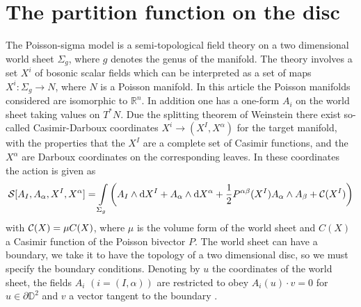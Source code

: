 \documentclass[a4paper,twoside,11pt]{article}
\numberwithin{equation}{section}
\begin{document}
\section{The partition function on the disc}
%
%
The Poisson-sigma model is a semi-topological field theory on a two dimensional world sheet $\Sigma_g$, 
where $g$ denotes the genus of the manifold. The theory involves a set $X^i$ of bosonic scalar fields which 
can be interpreted as a set of maps $X^i:\Sigma_g\rightarrow N$, where $N$ is a Poisson manifold. 
In this article the Poisson manifolds considered are isomorphic to $\mathds{R}^n$. In addition one has a 
one-form $A_i$ on the world sheet taking values on $T^\ast N$. Due the splitting theorem of Weinstein 
\cite{WE} there exist so-called Casimir-Darboux coordinates $X^i\rightarrow (X^I,X^\alpha)$ for the target manifold, with the properties that the $X^I$ are a complete set of Casimir functions, and the $X^\alpha$ are Darboux coordinates on the corresponding leaves.
In these coordinates the action is given as 
\begin{gather}
\mathcal{S}[A_I,A_\alpha,X^I,X^\alpha]=\int\limits_{\Sigma_g}\left(A_I\wedge{\rm d}X^I+A_\alpha\wedge\mathrm d X^\alpha+
\frac{1}{2}P^{\alpha\beta}(X^I)A_\alpha\wedge A_\beta+\mathcal{C}(X^I)\right)
\end{gather}
with $\mathcal{C}(X)=\mu C(X)$, where $\mu$ is the volume form of the world sheet and $C(X)$ a Casimir function 
of the Poisson bivector $P$. The world sheet can have a boundary, we take it to have the topology of 
a two dimensional disc,  so we must specify the boundary conditions. Denoting by $u$ the 
coordinates of the world sheet, the fields $A_i$ $(i=(I,\alpha))$ are restricted 
to obey $A_i(u)\cdot v=0$ for $u\in\partial \mathbb{D}^2$ and $v$ a vector tangent to the boundary 
\cite{CF1}. 
\end{document}
